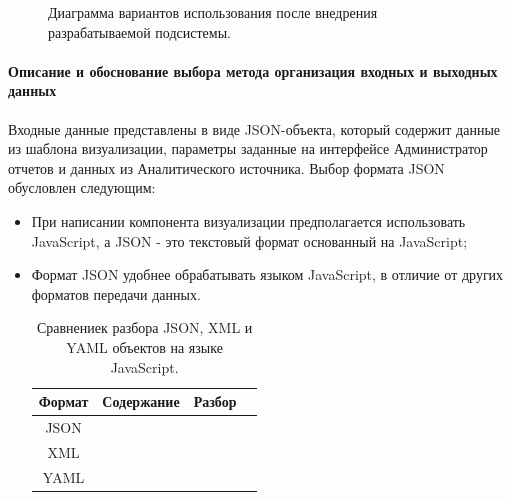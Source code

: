 \documentclass[a4paper]{extarticle}
\begin{document}
\begin{figure}[H]
\caption{Диаграмма вариантов использования после внедрения разрабатываемой подсистемы.}
\label{ris2}
\end{figure}\par

\paragraph{Описание и обоснование выбора метода организация входных и выходных данных}
Входные данные представлены в виде JSON-объекта, который содержит данные из шаблона визуализации, параметры заданные на интерфейсе Администратор отчетов и данных из Аналитического источника. Выбор формата JSON обусловлен следующим:
\begin{itemize}
\item При написании компонента визуализации предполагается использовать JavaScript, а JSON - это текстовый формат основанный на JavaScript;
\item Формат JSON удобнее обрабатывать языком JavaScript, в отличие от других форматов передачи данных.

\begin{table}[H]
\caption{Сравнениек разбора JSON, XML и YAML объектов на языке JavaScript.}
\centering
  \begin{tabular}{|c|c|c|c|}
  \hline
  Формат & Содержание & Разбор \\\hline
  JSON  &  
  & 
  \\\hline
  XML   &  
  & 
  \\\hline
  YAML  & 
  & 
  \\\hline
  \end{tabular}
\end{table}\par
\end{itemize}
\end{document}
